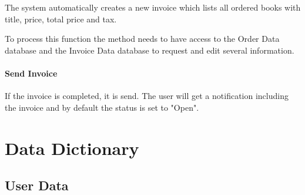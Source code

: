 \documentclass[11pt,a4paper,oneside,svgnames]{report}
\begin{document}
The system automatically creates a new invoice which lists all ordered books with title, price, total price and tax.

To process this function the method needs to have access to the Order Data database and the Invoice Data database to request and edit several information.

\subsubsection{Send Invoice}

If the invoice is completed, it is send. The user will get a notification including the invoice and by default the status is set to "Open".

\chapter{Data Dictionary}
\label{sec:dd}
\section{User Data}
\end{document}
